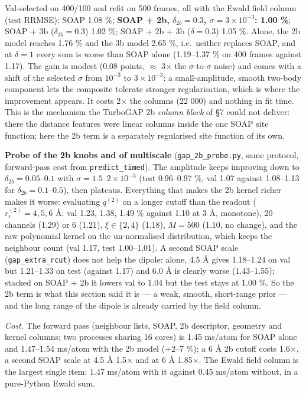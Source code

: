 \documentclass[11pt,a4paper]{article}
\begin{document}
Val-selected on 400/100 and refit on 500 frames, all with the Ewald field column (test RRMSE): SOAP 1.08 \%; \textbf{SOAP + 2b,
\(\delta_{2b}=0.3\), \(\sigma=3\times10^{-3}\): 1.00 \%}; SOAP + 3b (\(\delta_{3b}=0.3\)) 1.02 \%;
SOAP + 2b + 3b (\(\delta=0.3\)) 1.05 \%. Alone, the 2b model reaches 1.76 \% and the 3b model 2.65
\%, i.e.~neither replaces SOAP, and at \(\delta=1\) every sum is worse than SOAP alone (1.19--1.37
\% on 400 frames against 1.17). The gain is modest (0.08 points, \(\approx\) 3\(\times\) the
\(\sigma\)-to-\(\sigma\) noise) and comes with a shift of the selected \(\sigma\) from \(10^{-3}\)
to \(3\times10^{-3}\): a small-amplitude, smooth two-body component lets the composite tolerate
stronger regularisation, which is where the improvement appears. It costs 2\(\times\) the columns
(22 000) and nothing in fit time. This is the mechanism the TurboGAP 2b \emph{column block} of §7
could not deliver: there the distance features were linear columns inside the one SOAP site
function; here the 2b term is a separately regularised site function of its own.

\textbf{Probe of the 2b knobs and of multiscale} (\texttt{gap\_2b\_probe.py}, same protocol,
forward-pass cost from \texttt{predict\_timed}). The amplitude keeps improving down to
\(\delta_{2b}=0.05\)--\(0.1\) with \(\sigma=1.5\)--\(2\times10^{-3}\) (test 0.96--0.97 \%, val 1.07
against 1.08--1.13 for \(\delta_{2b}=0.1\)--\(0.5\)), then plateaus. Everything that makes the 2b
kernel richer makes it worse: evaluating \(q^{(2)}\) on a longer cutoff than the readout
(\(r_c^{(2)}=4,5,6\) \AA{}: val 1.23, 1.38, 1.49 \% against 1.10 at 3 \AA{}, monotone), 20 channels
(1.29) or 6 (1.21), \(\xi\in\{2,4\}\) (1.18), \(M=500\) (1.10, no change), and the raw polynomial
kernel on the un-normalised distribution, which keeps the neighbour count (val 1.17, test
1.00--1.01). A second SOAP scale (\texttt{gap\_extra\_rcut}) does not help the dipole: alone, 4.5
\AA{} gives 1.18--1.24 on val but 1.21--1.33 on test (against 1.17) and 6.0 \AA{} is clearly worse
(1.43--1.55); stacked on SOAP + 2b it lowers val to 1.04 but the test stays at 1.00 \%. So the 2b
term is what this section said it is --- a weak, smooth, short-range prior --- and the long range of
the dipole is already carried by the field column.

\emph{Cost.} The forward pass (neighbour lists, SOAP, 2b descriptor, geometry and kernel columns;
two processes sharing 16 cores) is 1.45 ms/atom for SOAP alone and 1.47--1.54 ms/atom with the 2b
model (+2--7 \%); a 6 \AA{} 2b cutoff costs 1.6\(\times\), a second SOAP scale at 4.5 \AA{}
1.5\(\times\) and at 6 \AA{} 1.85\(\times\). The Ewald field column is the largest single item: 1.47
ms/atom with it against 0.45 ms/atom without, in a pure-Python Ewald sum.
\end{document}
